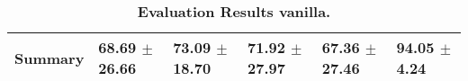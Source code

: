 \begin{table}[htb]
{\begin{tabular}{llllll}
\midrule
\textbf{Summary                                  } &                  \phantom{0}68.69 $\pm$ 26.66 &                      \phantom{0}73.09 $\pm$ 18.70 &                  \phantom{0}71.92 $\pm$ 27.97 &            \phantom{0}67.36 $\pm$ 27.46 &  \phantom{0}94.05 $\pm$ \phantom{0}4.24 \\
\bottomrule
\end{tabular}%
}
\caption{\textbf{Evaluation Results vanilla.}}
\label{tab:eval-results}
\end{table}


